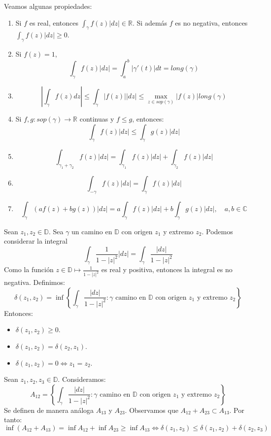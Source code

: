 Veamos algunas propiedades:
\begin{enumerate}
    \item Si $f$ es real, entonces $\int_\gamma f(z)|dz| \in \mathbb{R}$.
          Si además $f$ es no negativa, entonces $\int_\gamma f(z)|dz| \geq 0$.
    \item Si $f(z) = 1$,
          $$\int_\gamma f(z)|dz| = \int_a^b |\gamma'(t)|dt = long(\gamma)$$
    \item $$\left|\int_\gamma f(z)dz\right| \leq \int_\gamma |f(z)||dz| \leq \max_{z \in sop(\gamma)} |f(z)|long(\gamma)$$
    \item Si $f, g: sop(\gamma) \to \mathbb{R}$ continuas y $f \leq g$, entonces:
          $$\int_\gamma f(z)|dz| \leq \int_\gamma g(z)|dz|$$
    \item $$\int_{\gamma_1 + \gamma_2} f(z)|dz| = \int_{\gamma_1} f(z)|dz| + \int_{\gamma_2} f(z)|dz|$$
    \item $$\int_{-\gamma} f(z)|dz| = \int_\gamma f(z)|dz|$$
    \item $$\int_\gamma (af(z) + bg(z))|dz| = a\int_\gamma f(z)|dz| + b\int_\gamma g(z)|dz|, \quad a, b \in \mathbb{C}$$
\end{enumerate}

Sean $z_1, z_2 \in \mathbb{D}$.
Sea $\gamma$ un camino en $\mathbb{D}$ con origen $z_1$ y extremo $z_2$.
Podemos considerar la integral
$$\int_\gamma \frac{1}{1-|z|^2}|dz| = \int_\gamma \frac{|dz|}{1-|z|^2}$$
Como la función $z \in \mathbb{D} \mapsto \frac{1}{1-|z|^2}$ es real y positiva, entonces la integral es no negativa.
Definimos:
$$\delta(z_1, z_2) = \inf \left\{\int_\gamma \frac{|dz|}{1-|z|^2} : \gamma \text{ camino en } \mathbb{D} \text{ con origen } z_1 \text{ y extremo } z_2\right\}$$
Entonces:
\begin{itemize}
    \item $\delta(z_1, z_2) \geq 0$.
    \item $\delta(z_1, z_2) = \delta(z_2, z_1)$.
    \item $\delta(z_1, z_2) = 0 \Leftrightarrow z_1 = z_2$.
\end{itemize}

Sean $z_1, z_2, z_3 \in \mathbb{D}$.
Consideramos:
$$A_{12} = \left\{\int_\gamma \frac{|dz|}{1-|z|^2} : \gamma \text{ camino en } \mathbb{D} \text{ con origen } z_1 \text{ y extremo } z_2\right\}$$
Se definen de manera análoga $A_{13}$ y $A_{23}$.
Observamos que $A_{12} + A_{23} \subset A_{13}$.
Por tanto:
$$\inf(A_{12} + A_{13}) = \inf A_{12} + \inf A_{23} \geq \inf A_{13} \Leftrightarrow \delta(z_1, z_3) \leq \delta(z_1, z_2) + \delta(z_2, z_3)$$

